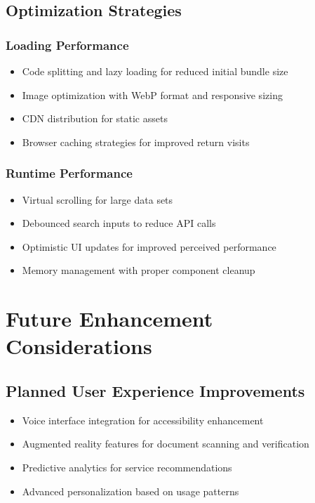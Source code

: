 \documentclass[12pt,a4paper]{article}
\begin{document}
\subsection{Optimization Strategies}

\subsubsection{Loading Performance}
\begin{itemize}
    \item Code splitting and lazy loading for reduced initial bundle size
    \item Image optimization with WebP format and responsive sizing
    \item CDN distribution for static assets
    \item Browser caching strategies for improved return visits
\end{itemize}

\subsubsection{Runtime Performance}
\begin{itemize}
    \item Virtual scrolling for large data sets
    \item Debounced search inputs to reduce API calls
    \item Optimistic UI updates for improved perceived performance
    \item Memory management with proper component cleanup
\end{itemize}

\section{Future Enhancement Considerations}

\subsection{Planned User Experience Improvements}

\begin{itemize}
    \item Voice interface integration for accessibility enhancement
    \item Augmented reality features for document scanning and verification
    \item Predictive analytics for service recommendations
    \item Advanced personalization based on usage patterns
\end{itemize}
\end{document}
